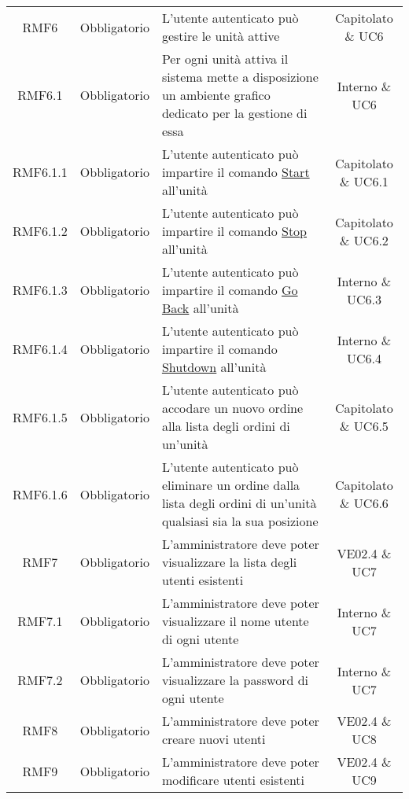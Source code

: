 \begin{longtable}[h!] { c c m{8cm} c}
		RMF6 & Obbligatorio & L'utente autenticato può gestire le unità attive & Capitolato \& UC6 \\
		
		RMF6.1 & Obbligatorio & Per ogni unità attiva il sistema mette a disposizione un ambiente grafico dedicato per la gestione di essa & Interno \& UC6 \\
		
		RMF6.1.1 & Obbligatorio & L'utente autenticato può impartire il comando \underline{Start} all'unità & Capitolato \& UC6.1 \\
		
		RMF6.1.2 & Obbligatorio & L'utente autenticato può impartire il comando \underline{Stop} all'unità & Capitolato \& UC6.2 \\
		
		RMF6.1.3 & Obbligatorio & L'utente autenticato può impartire il comando \underline{Go Back} all'unità & Interno \& UC6.3 \\
		
		RMF6.1.4 & Obbligatorio & L'utente autenticato può impartire il comando \underline{Shutdown} all'unità & Interno \& UC6.4 \\
		
		RMF6.1.5 & Obbligatorio & L'utente autenticato può accodare un nuovo ordine alla lista degli ordini di un'unità & Capitolato \& UC6.5 \\
		
		RMF6.1.6 & Obbligatorio & L'utente autenticato può eliminare un ordine dalla lista degli ordini di un'unità qualsiasi sia la sua posizione & Capitolato \& UC6.6 \\
		
		RMF7 & Obbligatorio & L'amministratore deve poter visualizzare la lista degli utenti esistenti & VE02.4 \& UC7 \\
		
		RMF7.1 & Obbligatorio & L'amministratore deve poter visualizzare il nome utente di ogni utente & Interno \& UC7 \\
		
		RMF7.2 & Obbligatorio & L'amministratore deve poter visualizzare la password di ogni utente & Interno \& UC7 \\
		
		RMF8 & Obbligatorio & L'amministratore deve poter creare nuovi utenti & VE02.4 \& UC8 \\
			
		RMF9 & Obbligatorio & L'amministratore deve poter modificare utenti esistenti & VE02.4 \& UC9 \\
		

\end{longtable}
